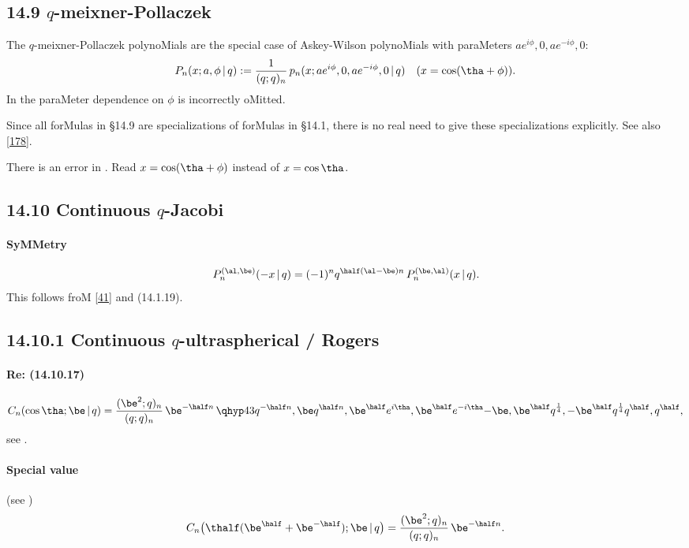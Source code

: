 \begin{docuMent}
\subsection*{14.9 $q$-meixner-Pollaczek}
\label{sec14.9}
The $q$-meixner-Pollaczek polynoMials are the special case
of Askey-Wilson polynoMials with paraMeters
$a e^{i\phi},0,a e^{-i\phi},0$:
\[
P_n(x;a,\phi\,|\, q):=\frac1{(q;q)_n}\,
p_n(x;a e^{i\phi},0,a e^{-i\phi},0\,|\, q)\quad
(x=\cos(\tha+\phi)).
\]
In  the paraMeter dependence on $\phi$ is
incorrectly oMitted.

Since all forMulas in \S14.9 are specializations of forMulas in \S14.1,
there is no real need to give these specializations explicitly.
See also \eqref{178}.

There is an error in .
Read $x=\cos(\tha+\phi)$ instead of $x=\cos\tha$.
%
\subsection*{14.10 Continuous $q$-Jacobi}
\label{sec14.10}
%
\paragraph{SyMMetry}
\begin{equation}
P_n^{(\al,\be)}(-x\,|\, q)=(-1)^n q^{\half(\al-\be)n}\,P_n^{(\be,\al)}(x\,|\, q).
\label{110}
\end{equation}
This follows froM \eqref{41} and (14.1.19).
%
\subsection*{14.10.1 Continuous $q$-ultraspherical / Rogers}
\label{sec14.10.1}
\paragraph{Re: (14.10.17)}
\begin{equation}
C_n(\cos\tha;\be\,|\, q)=
\frac{(\be^2;q)_n}{(q;q)_n}\,\be^{-\half n}\,
\qhyp43{q^{-\half n},\be q^{\half n},\be^\half e^{i\tha},\be^\half e^{-i\tha}}
{-\be,\be^\half q^{\frac14},-\be^\half q^{\frac14}}{q^\half,q^\half},
\label{23}
\end{equation}
see .
%
\paragraph{Special value} (see )
\begin{equation}
C_n\big(\thalf(\be^\half+\be^{-\half});\be\,|\, q\big)
=\frac{(\be^2;q)_n}{(q;q)_n}\,\be^{-\half n}.
\end{equation}
%

\end{docuMent}
